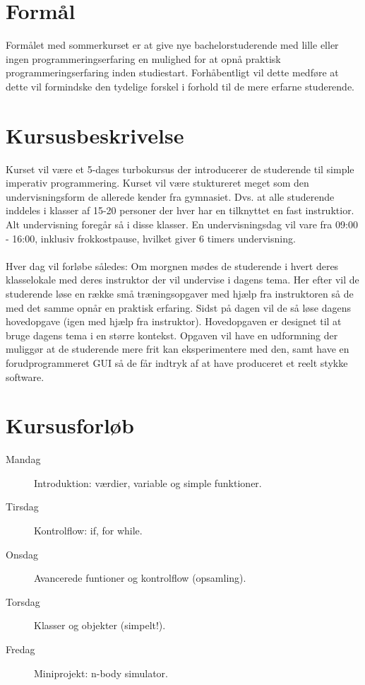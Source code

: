 \documentclass[11pt,a4paper]{article}
\begin{document}
\maketitle


\section{Formål}
Formålet med sommerkurset er at give nye bachelorstuderende med lille eller ingen
programmeringserfaring en mulighed for at opnå praktisk programmeringserfaring   
inden studiestart. Forhåbentligt vil dette medføre at dette vil formindske den
tydelige forskel i forhold til de mere erfarne studerende. %

\section{Kursusbeskrivelse}
Kurset vil være et 5-dages turbokursus der introducerer de studerende til simple
imperativ programmering. 
Kurset vil være stuktureret meget som den undervisningsform de allerede kender
fra gymnasiet. Dvs. at alle studerende inddeles i klasser af 15-20 personer der
hver har en tilknyttet en fast instruktior. Alt undervisning foregår så i disse
klasser. En undervisningsdag vil vare fra 09:00 - 16:00, inklusiv frokkostpause,
hvilket giver 6 timers undervisning.
\\\\
Hver dag vil forløbe således: Om morgnen mødes de studerende i hvert deres 
klasselokale med deres instruktor der vil undervise i dagens tema. Her efter vil 
de studerende løse en række små træningsopgaver med hjælp fra instruktoren så de
med det samme opnår en praktisk erfaring. Sidst på dagen vil de så løse dagens
hovedopgave (igen med hjælp fra instruktor). Hovedopgaven er designet til at 
bruge dagens tema i en større kontekst. Opgaven vil have en udformning der 
muliggør at de studerende mere frit kan eksperimentere med den, samt have en 
forudprogrammeret GUI så de får indtryk af at have produceret et reelt stykke 
software.

\section{Kursusforløb}
\begin{description}
  \item[Mandag] Introduktion: værdier, variable og simple funktioner.
  \item[Tirsdag] Kontrolflow: if, for while.
  \item[Onsdag] Avancerede funtioner og kontrolflow (opsamling).
  \item[Torsdag] Klasser og objekter (simpelt!).
  \item[Fredag] Miniprojekt: n-body simulator.
\end{description}
\end{document}
